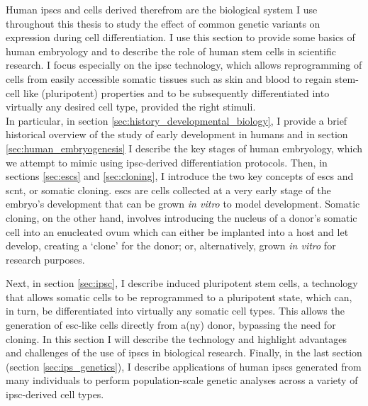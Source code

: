 Human \glspl{ipsc} and cells derived therefrom are the biological system I use throughout this thesis to study the effect of common genetic variants on expression during cell differentiation.
I use this section to provide some basics of human embryology and to describe the role of human stem cells in scientific research.
I focus especially on the \gls{ipsc} technology, which allows reprogramming of cells from easily accessible somatic tissues such as skin and blood to regain stem-cell like (pluripotent) properties and to be subsequently differentiated into virtually any desired cell type, provided the right stimuli.\\

In particular, in section \ref{sec:history_developmental_biology}, I provide a brief historical overview of the study of early development in humans and in section \ref{sec:human_embryogenesis} I describe the key stages of human embryology, which we attempt to mimic using \gls{ipsc}-derived differentiation protocols.
Then, in sections \ref{sec:escs} and \ref{sec:cloning}, I introduce the two key concepts of \glspl{esc} and \gls{scnt}, or somatic cloning.
\glspl{esc} are cells collected at a very early stage of the embryo's development that can be grown \textit{in vitro} to model development.
Somatic cloning, on the other hand, involves introducing the nucleus of a donor's somatic cell into an enucleated ovum which can either be implanted into a host and let develop, creating a `clone' for the donor; or, alternatively, grown \textit{in vitro} for research purposes.
 
Next, in section \ref{sec:ipsc}, I describe induced pluripotent stem cells, a technology that allows somatic cells to be reprogrammed to a pluripotent state, which can, in turn, be differentiated into virtually any
somatic cell types.
This allows the generation of \gls{esc}-like cells directly from a(ny) donor, bypassing the need for cloning. 
In this section I will describe the technology and highlight advantages and challenges of the use of \glspl{ipsc} in biological research.
Finally, in the last section (section \ref{sec:ips_genetics}), I describe 
applications of human \glspl{ipsc} generated from many individuals to perform population-scale genetic analyses across a variety of \gls{ipsc}-derived cell types.

\newpage

